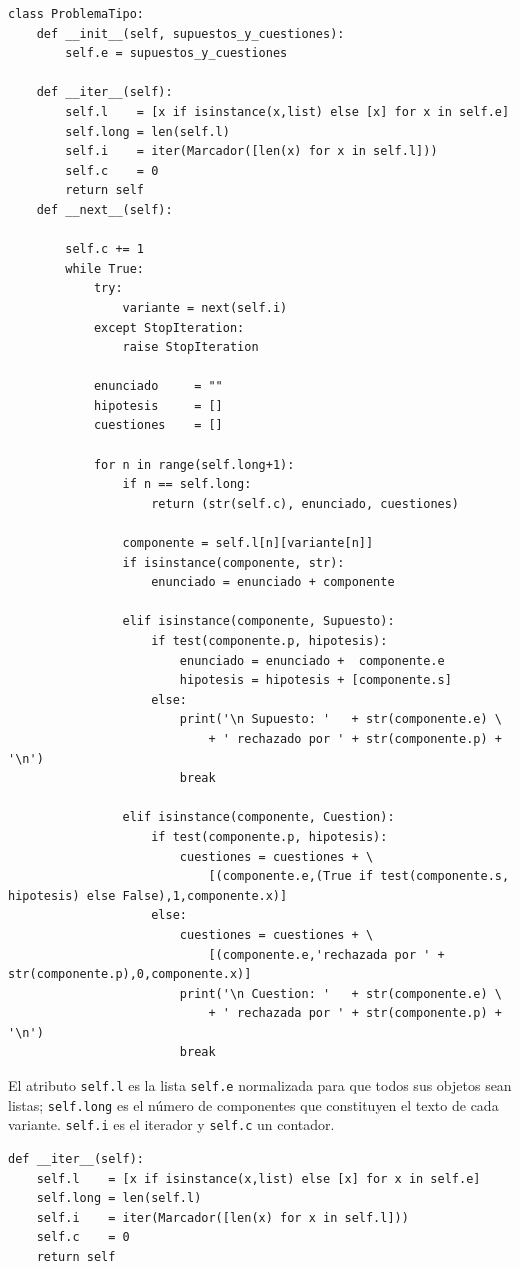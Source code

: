 \documentclass[10pt,a4paper]{report}
\begin{document}
\begin{verbatim}
class ProblemaTipo:
    def __init__(self, supuestos_y_cuestiones):
        self.e = supuestos_y_cuestiones

    def __iter__(self):
        self.l    = [x if isinstance(x,list) else [x] for x in self.e]
        self.long = len(self.l)
        self.i    = iter(Marcador([len(x) for x in self.l]))
        self.c    = 0
        return self
    def __next__(self):
    
        self.c += 1
        while True:
            try:
                variante = next(self.i)
            except StopIteration:
                raise StopIteration
    
            enunciado     = ""
            hipotesis     = []
            cuestiones    = []
    
            for n in range(self.long+1):
                if n == self.long:
                    return (str(self.c), enunciado, cuestiones)
    
                componente = self.l[n][variante[n]]
                if isinstance(componente, str):
                    enunciado = enunciado + componente
                
                elif isinstance(componente, Supuesto):
                    if test(componente.p, hipotesis):
                        enunciado = enunciado +  componente.e
                        hipotesis = hipotesis + [componente.s]
                    else:
                        print('\n Supuesto: '   + str(componente.e) \
                            + ' rechazado por ' + str(componente.p) + '\n')
                        break
                
                elif isinstance(componente, Cuestion):
                    if test(componente.p, hipotesis):
                        cuestiones = cuestiones + \
                            [(componente.e,(True if test(componente.s, hipotesis) else False),1,componente.x)]
                    else:
                        cuestiones = cuestiones + \
                            [(componente.e,'rechazada por ' + str(componente.p),0,componente.x)]
                        print('\n Cuestion: '   + str(componente.e) \
                            + ' rechazada por ' + str(componente.p) + '\n')
                        break

\end{verbatim}

El atributo \texttt{self.l} es la lista \texttt{self.e} normalizada para que todos sus objetos sean listas; \texttt{self.long} es el número de componentes que constituyen el texto de cada variante.
\texttt{self.i} es el iterador y \texttt{self.c} un contador.
\begin{verbatim}
def __iter__(self):
    self.l    = [x if isinstance(x,list) else [x] for x in self.e]
    self.long = len(self.l)
    self.i    = iter(Marcador([len(x) for x in self.l]))
    self.c    = 0
    return self
\end{verbatim}
\end{document}
